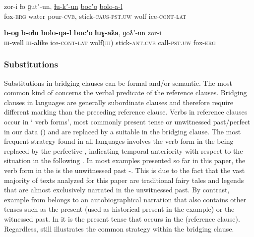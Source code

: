 \documentclass[output=paper]{LSP/langsci}
\begin{document}
\begin{exe}
	\ex	\label{ex:12ab}
	\begin{xlist}
		\ex	\label{ex:12a}
		\gll	zor-i		ɬo   		ɡutʼ-un, 			\underline{ɬu-kʼ-un}     			\underline{bocʼo} 	\underline{bolo-a-l}\\
			fox-\textsc{erg} 	water 	pour-\textsc{cvb}, 	stick-\textsc{caus-pst.uw} 	wolf   	ice-\textsc{cont-lat}\\
		\glt	{}

		\ex	\label{ex:12b}
		\gll		\textbf{b-oɡ}  		\textbf{b-oɬu}  	\textbf{bolo-qa-l}    	\textbf{bocʼo} 	\textbf{ɬuɣ-aƛa},  ɡoƛʼ-un    		zor-i \\
			\textsc{iii}-well 		\textsc{iii}-alike 	ice-\textsc{cont-lat}  	wolf(\textsc{iii})   	stick-\textsc{ant.cvb} call-\textsc{pst.uw} 		fox-\textsc{erg}  \\
		\glt	{} 
	\end{xlist}
\end{exe}



\subsubsection{Substitutions}
\label{ssec:Substitutions}
Substitutions in bridging clauses can be formal and/or semantic. The most common kind of  concerns the verbal predicate of the reference clauses. Bridging clauses in  languages are generally subordinate clauses and therefore require different marking than the preceding reference clause. Verbs in reference clauses occur in ` verb forms', most commonly present tense or unwitnessed past/perfect in our data () and are replaced by a suitable  in the bridging clause. The most frequent  strategy found in all  languages involves the verb form in the  being replaced by the perfective , indicating temporal anteriority with respect to the situation in the following . In most examples presented so far in this paper, the verb form in the  is the unwitnessed past -. This is due to the fact that the vast majority of texts analyzed for this paper are traditional fairy tales and legends that are almost exclusively narrated in the unwitnessed past. By contrast, example  from  belongs to an autobiographical narration that also contains other tenses such as the present (used as historical present in the example) or the witnessed past. In  it is the present tense that occurs in the  (reference clause). Regardless,  still illustrates the common  strategy within the bridging clause.  
\end{document}
